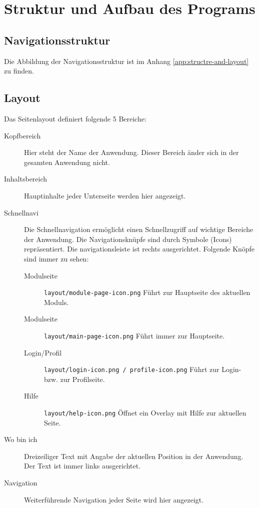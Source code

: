 \chapter{Struktur und Aufbau des Programs}

%
%
%
\section{Navigationsstruktur}
\label{sec:navigation}
Die Abbildung der Navigationsstruktur ist im Anhang \ref{app:structre-and-layout} zu finden.

%
%
%
\section{Layout}
\label{sec:layout}

Das Seitenlayout definiert folgende 5 Bereiche:
\begin{description}
  \item[Kopfbereich] Hier steht der Name der Anwendung. Dieser Bereich änder sich in der gesamten Anwendung nicht.
  \item[Inhaltsbereich] Hauptinhalte jeder Unterseite werden hier angezeigt.
  \item[Schnellnavi] Die Schnellnavigation ermöglicht einen Schnellzugriff auf wichtige Bereiche der Anwendung. Die Navigationsknüpfe sind durch Symbole (Icons) repräsentiert. Die navigationsleiste ist rechts ausgerichtet. Folgende Knöpfe sind immer zu sehen:
  \begin{description}
    \item[Modulseite] \texttt{layout/module-page-icon.png} Führt zur Hauptseite des aktuellen Moduls. 
    \item[Modulseite] \texttt{layout/main-page-icon.png} Führt immer zur Hauptseite. 
    \item[Login/Profil] \texttt{layout/login-icon.png / profile-icon.png} Führt zur Login- bzw. zur Profilseite. 
    \item[Hilfe] \texttt{layout/help-icon.png} Öffnet ein Overlay mit Hilfe zur aktuellen Seite. 
  \end{description}
  
  \item[Wo bin ich] Dreizeiliger Text mit Angabe der aktuellen Position in der Anwendung. Der Text ist immer links ausgerichtet.
  \item[Navigation] Weiterführende Navigation jeder Seite wird hier angezeigt.
\end{description}


